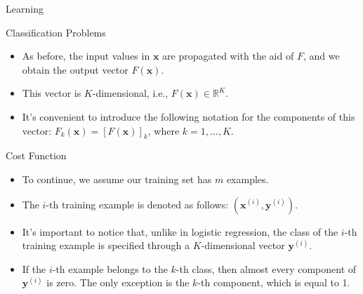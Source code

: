\documentclass[8pt,american]{beamer}
\begin{document}
\begin{frame}{Learning}

\begin{block}{Classification Problems}
\begin{itemize}
\justifying
\item As before, the input values in $\mathbf{x}$ are propagated with the aid
  of $F$, and we obtain the output vector $F\left(\mathbf{x}\right)$.
\item This vector is $K$-dimensional, i.e.,
  $F\left(\mathbf{x}\right)\in\mathbb{R}^{K}$.
\item It's convenient to introduce the following notation for the components of
  this vector:
  $F_{k}\left(\mathbf{x}\right)=\left[F\left(\mathbf{x}\right)\right]_{k}$,
  where $k=1,\ldots,K$.
\end{itemize}
\end{block}

\begin{block}{Cost Function}
\begin{itemize}
\justifying
\item To continue, we assume our training set has $m$ examples.
\item The $i$-th training example is denoted as follows:
  $\left(\mathbf{x}^{\left(i\right)},\mathbf{y}^{\left(i\right)}\right)$.
\item It's important to notice that, unlike in logistic regression, the class
  of the $i$-th training example is specified through a $K$-dimensional vector
  $\mathbf{y}^{\left(i\right)}$.
\item If the $i$-th example belongs to the $k$-th class, then almost every
  component of $\mathbf{y}^{\left(i\right)}$ is zero. The only exception is the
  $k$-th component, which is equal to 1.
\end{itemize}
\end{block}

\end{frame}
\end{document}
